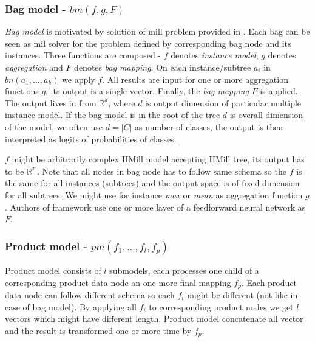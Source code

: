 \subsubsection{Bag model - $bm(f,g,F)$}
\emph{Bag model} is motivated by solution of mill problem provided in \cite{Pevny2016a}. Each bag can be seen as mil solver for the problem defined by corresponding bag node and its instances. Three functions are composed - $f$ denotes \emph{instance model}, $g$ denotes \emph{aggregation} and $F$ denotes \emph{bag mapping}. On each instance/subtree $a_i$ in $bn(a_1,\dots,a_k)$ we apply $f$. All results are input for one or more aggregation functions $g$, its output is a single vector. Finally, the \emph{bag mapping} $F$ is applied. The output lives in from $\mathbb{R}^d$, where $d$ is output dimension of particular multiple instance model. If the bag model is in the root of the tree $d$ is overall dimension of the model, we often use $d=|C|$ as number of classes, the output is then interpreted as logits of probabilities of classes.

$f$ might be arbitrarily complex HMill model accepting HMill tree, its output has to be $\mathbb{R^m}$. Note that all nodes in bag node has to follow same schema so the $f$ is the same for all instances (subtrees) and the output space is of fixed dimension for all subtrees. We might use for instance \emph{max} or \emph{mean} as aggregation function $g$. Authors of framework use one or more layer of a feedforward neural network as $F$.

\subsubsection{Product model - $pm(f_1,\dots,f_l,f_p)$}
Product model consists of $l$ submodels, each processes  one child of a corresponding product data node an one more final mapping $f_p$. Each product data node can follow different schema so each $f_i$ might be different (not like in case of bag model). By applying all $f_i$ to corresponding product nodes we get $l$ vectors which might have different length. Product model concatenate all vector and the result is transformed one or more time by $f_p$.



